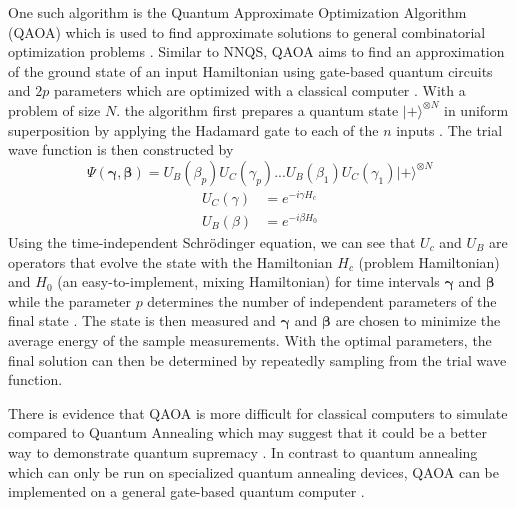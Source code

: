 One such algorithm is the Quantum Approximate Optimization Algorithm (QAOA) which is used to find approximate solutions to general combinatorial optimization problems \cite{b23}. Similar to NNQS, QAOA aims to find an approximation of the ground state of an input Hamiltonian using gate-based quantum circuits and $2p$ parameters which are optimized with a classical computer \cite{b34}. With a problem of size $N$. the algorithm first prepares a quantum state $| + \rangle^{\otimes N}$ in uniform superposition by applying the Hadamard gate to each of the $n$ inputs \cite{b34}. The trial wave function is then constructed by
\begin{equation}
    \Psi(\boldsymbol{\gamma}, \boldsymbol{\beta}) = U_B(\beta_p) U_C(\gamma_p)...U_B(\beta_1) U_C(\gamma_1) | + \rangle^{\otimes N}
\end{equation}
\begin{align*}
    U_C(\gamma) &= e^{-i\gamma H_c} \\
    U_B(\beta) &= e^{-i\beta H_0}
\end{align*}
Using the time-independent Schrödinger equation, we can see that $U_c$ and $U_B$ are operators that evolve the state with the Hamiltonian $H_c$ (problem Hamiltonian) and $H_0$ (an easy-to-implement, mixing Hamiltonian) for time intervals $\boldsymbol{\gamma}$ and $\boldsymbol{\beta}$ while the parameter $p$ determines the number of independent parameters of the final state \cite{b34}. The state is then measured and $\boldsymbol{\gamma}$ and $\boldsymbol{\beta}$ are chosen to minimize the average energy of the sample measurements. With the optimal parameters, the final solution can then be determined by repeatedly sampling from the trial wave function.

There is evidence that QAOA is more difficult for classical computers to simulate compared to Quantum Annealing which may suggest that it could be a better way to demonstrate quantum supremacy \cite{farhi2016quantum}. In contrast to quantum annealing which can only be run on specialized quantum annealing devices, QAOA can be implemented on a general gate-based quantum computer \cite{b22}. 